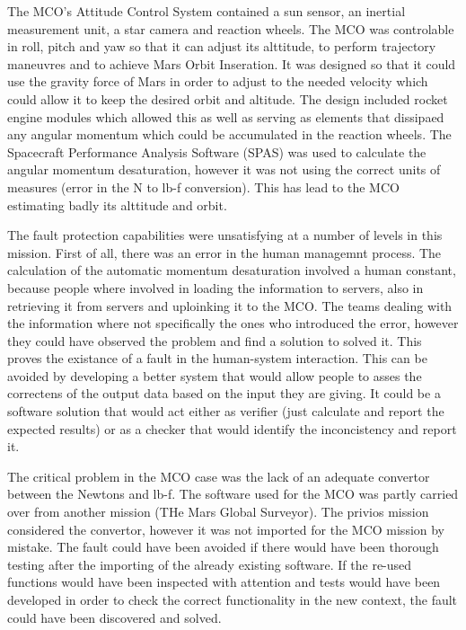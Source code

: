 The MCO's Attitude Control System contained a sun sensor, an inertial
measurement unit, a star camera and reaction wheels. The MCO was controlable in
roll, pitch and yaw so that it can adjust its alttitude, to perform trajectory
maneuvres and to achieve Mars Orbit Inseration. It was designed so that it could
use the gravity force of Mars in order to adjust to the needed velocity which
could allow it to keep the desired orbit and altitude. The design included
rocket engine modules which allowed this as well as serving as elements that
dissipaed any angular momentum which could be accumulated in the reaction
wheels. The Spacecraft Performance Analysis Software (SPAS) was used to
calculate the angular momentum desaturation, however it was not using the
correct units of measures (error in the N to lb-f conversion). This has lead to
the MCO estimating badly its alttitude and orbit.

The fault protection capabilities were unsatisfying at a number of levels in
this mission. First of all, there was an error in the human managemnt process.
The calculation of the automatic momentum desaturation involved a human
constant, because people where involved in loading the information to servers,
also in retrieving it from servers and uploinking it to the MCO. The teams
dealing with the information where not specifically the ones who introduced the
error, however they could have observed the problem and find a solution to
solved it. This proves the existance of a fault in the human-system interaction.
This can be avoided by developing a better system that would allow people to
asses the correctens of the output data based on the input they are giving. It
could be a software solution that would act either as verifier (just calculate
and report the expected results) or as a checker that would identify the
inconcistency and report it.

The critical problem in the MCO case was the lack of an adequate convertor
between the Newtons and lb-f. The software used for the MCO was partly carried
over from another mission (THe Mars Global Surveyor). The privios mission
considered the convertor, however it was not imported for the MCO mission by mistake. The fault could have been
avoided if there would have been thorough testing after the importing of the
already existing software. If the re-used functions would have been inspected
with attention and tests would have been developed in order to check the correct
functionality in the new context, the fault could have been discovered and
solved.

